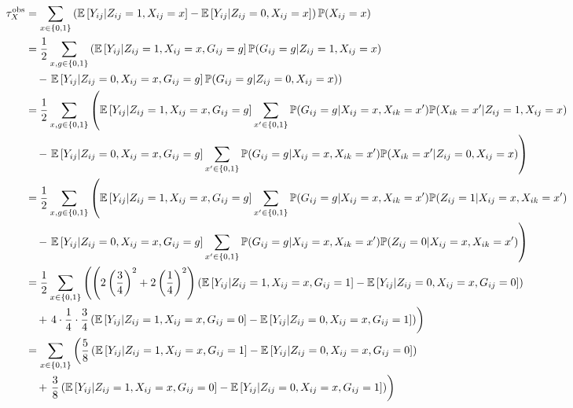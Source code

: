 \documentclass[10pt]{article}
\begin{document}
\begin{align*}
\tau_{X}^\text{obs} &= \sum_{x\in\{0,1\}}\left(\mathbb{E}\left[Y_{ij}|Z_{ij}=1,X_{ij}=x\right] - \mathbb{E}\left[Y_{ij}|Z_{ij}=0,X_{ij}=x\right]\right)\mathbb{P}(X_{ij}=x) \\
&= \frac{1}{2}\sum_{x,g\in\{0,1\}}\left(\mathbb{E}\left[Y_{ij}|Z_{ij}=1,X_{ij}=x,G_{ij}=g\right]\mathbb{P}(G_{ij}=g|Z_{ij}=1,X_{ij}=x)\right. \\
&\quad - \left.\mathbb{E}\left[Y_{ij}|Z_{ij}=0,X_{ij}=x,G_{ij}=g\right]\mathbb{P}(G_{ij}=g|Z_{ij}=0,X_{ij}=x)\right) \\
&= \frac{1}{2}\sum_{x,g\in\{0,1\}}\left(\mathbb{E}\left[Y_{ij}|Z_{ij}=1,X_{ij}=x,G_{ij}=g\right]\sum_{x'\in\{0,1\}}\mathbb{P}(G_{ij}=g|X_{ij}=x,X_{ik}=x')\mathbb{P}(X_{ik}=x'|Z_{ij}=1,X_{ij}=x)\right. \\
&\quad - \left.\mathbb{E}\left[Y_{ij}|Z_{ij}=0,X_{ij}=x,G_{ij}=g\right]\sum_{x'\in\{0,1\}}\mathbb{P}(G_{ij}=g|X_{ij}=x,X_{ik}=x')\mathbb{P}(X_{ik}=x'|Z_{ij}=0,X_{ij}=x)\right) \\
&= \frac{1}{2}\sum_{x,g\in\{0,1\}}\left(\mathbb{E}\left[Y_{ij}|Z_{ij}=1,X_{ij}=x,G_{ij}=g\right]\sum_{x'\in\{0,1\}}\mathbb{P}(G_{ij}=g|X_{ij}=x,X_{ik}=x')\mathbb{P}(Z_{ij}=1|X_{ij}=x,X_{ik}=x')\right. \\
&\quad - \left.\mathbb{E}\left[Y_{ij}|Z_{ij}=0,X_{ij}=x,G_{ij}=g\right]\sum_{x'\in\{0,1\}}\mathbb{P}(G_{ij}=g|X_{ij}=x,X_{ik}=x')\mathbb{P}(Z_{ij}=0|X_{ij}=x,X_{ik}=x')\right) \\
&= \frac{1}{2}\sum_{x\in\{0,1\}}\left(\left(2\left(\frac{3}{4}\right)^2+2\left(\frac{1}{4}\right)^2\right)\left(\mathbb{E}\left[Y_{ij}|Z_{ij}=1,X_{ij}=x,G_{ij}=1\right]-\mathbb{E}\left[Y_{ij}|Z_{ij}=0,X_{ij}=x,G_{ij}=0\right]\right) \right. \\
&\quad +\left. 4\cdot\frac{1}{4}\cdot\frac{3}{4}\left(\mathbb{E}\left[Y_{ij}|Z_{ij}=1,X_{ij}=x,G_{ij}=0\right]-\mathbb{E}\left[Y_{ij}|Z_{ij}=0,X_{ij}=x,G_{ij}=1\right]\right) \right) \\
&= \sum_{x\in\{0,1\}}\left(\frac{5}{8}\left(\mathbb{E}\left[Y_{ij}|Z_{ij}=1,X_{ij}=x,G_{ij}=1\right]-\mathbb{E}\left[Y_{ij}|Z_{ij}=0,X_{ij}=x,G_{ij}=0\right]\right) \right. \\
&\quad +\left. \frac{3}{8}\left(\mathbb{E}\left[Y_{ij}|Z_{ij}=1,X_{ij}=x,G_{ij}=0\right]-\mathbb{E}\left[Y_{ij}|Z_{ij}=0,X_{ij}=x,G_{ij}=1\right]\right) \right)
\end{align*}
\end{document}
